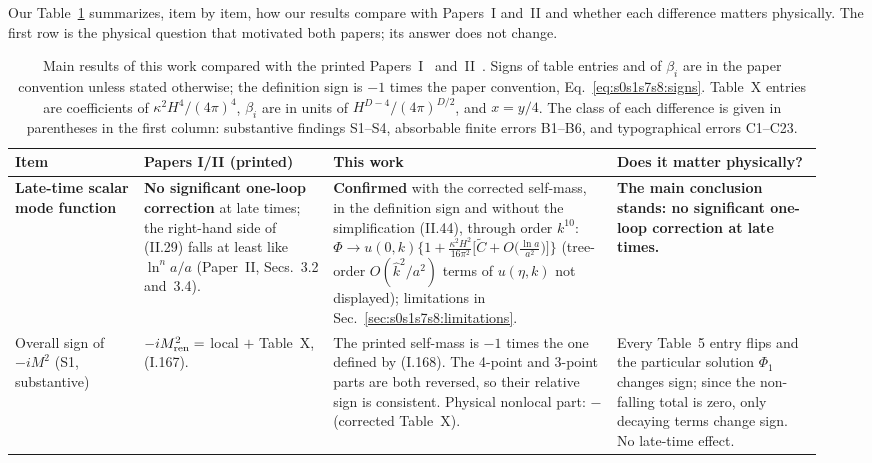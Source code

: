 \documentclass[aps,prd,onecolumn,10pt,nofootinbib,floatfix]{revtex4-2}
\newcommand{\eqI}[1]{(I.#1)}
\newcommand{\eqII}[1]{(II.#1)}
\begin{document}
Our Table~\ref{tab:s0s1s7s8:main} summarizes, item by item, how our results compare with Papers~I and~II and whether each difference
matters physically. The first row is the physical question that motivated both papers; its answer does not change.

\begin{table}[tbp]
\caption{Main results of this work compared with the printed Papers~I~\cite{KW07} and~II~\cite{KW08}. Signs of table entries and of
$\beta_i$ are in the paper convention unless stated otherwise; the definition sign is $-1$ times the paper convention,
Eq.~\eqref{eq:s0s1s7s8:signs}. Table~X entries are coefficients of $\kappa^2H^4/(4\pi)^4$, $\beta_i$ are in units of
$H^{D-4}/(4\pi)^{D/2}$, and $x=y/4$. The class of each difference is given in parentheses in the first column: substantive findings
S1--S4, absorbable finite errors B1--B6, and typographical errors C1--C23.}
\label{tab:s0s1s7s8:main}
\renewcommand{\arraystretch}{1.3}
\small
\begin{ruledtabular}
\begin{tabular}{@{}>{\raggedright\arraybackslash}p{0.15\linewidth}>{\raggedright\arraybackslash}p{0.22\linewidth}%
>{\raggedright\arraybackslash}p{0.33\linewidth}>{\raggedright\arraybackslash}p{0.24\linewidth}@{}}
Item & Papers I/II (printed) & This work & Does it matter physically?\\
\hline
\textbf{Late-time scalar mode function} &
\textbf{No significant one-loop correction} at late times; the right-hand side of \eqII{29} falls at least like $\ln^na/a$
(Paper~II, Secs.~3.2 and~3.4). &
\textbf{Confirmed} with the corrected self-mass, in the definition sign and without the simplification \eqII{44}, through order
$k^{10}$:
$\displaystyle\Phi\to u(0,k)\Big\{1+\frac{\kappa^2H^2}{16\pi^2}\Big[\tilde C+O\Big(\frac{\ln a}{a^2}\Big)\Big]\Big\}$
(tree-order $O(\hat k^2/a^2)$ terms of $u(\eta,k)$ not displayed); limitations in Sec.~\ref{sec:s0s1s7s8:limitations}. &
\textbf{The main conclusion stands: no significant one-loop correction at late times.}\\
\hline
Overall sign of $-iM^2$ (S1, substantive) &
$-iM^2_{\rm ren}=$ local $+$ Table~X, \eqI{167}. &
The printed self-mass is $-1$ times the one defined by \eqI{168}. The 4-point and 3-point parts are both reversed, so their relative
sign is consistent. Physical nonlocal part: $-$(corrected Table~X). &
Every Table~5 entry flips and the particular solution $\Phi_1$ changes sign; since the non-falling total is zero, only decaying
terms change sign. No late-time effect.\\

\end{tabular}
\end{ruledtabular}
\end{table}
\end{document}
